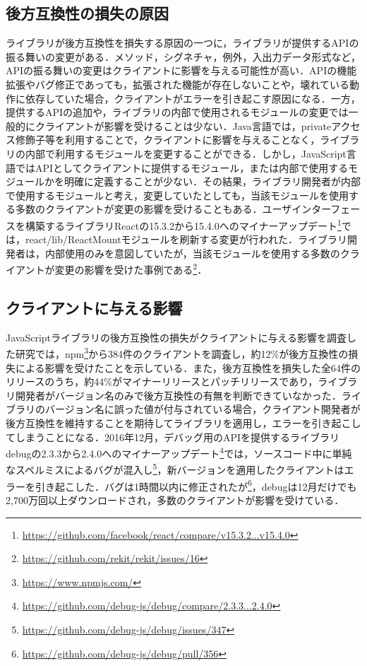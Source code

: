 \documentclass[submit]{ipsj}
\begin{document}
\subsection{後方互換性の損失の原因}
ライブラリが後方互換性を損失する原因の一つに，ライブラリが提供するAPIの振る舞いの変更がある．メソッド，シグネチャ，例外，入出力データ形式など，APIの振る舞いの変更はクライアントに影響を与える可能性が高い．APIの機能拡張やバグ修正であっても，拡張された機能が存在しないことや，壊れている動作に依存していた場合，クライアントがエラーを引き起こす原因になる．一方，提供するAPIの追加や，ライブラリの内部で使用されるモジュールの変更では一般的にクライアントが影響を受けることは少ない．Java言語では，privateアクセス修飾子等を利用することで，クライアントに影響を与えることなく，ライブラリの内部で利用するモジュールを変更することができる．しかし，JavaScript言語ではAPIとしてクライアントに提供するモジュール，または内部で使用するモジュールかを明確に定義することが少ない．その結果，ライブラリ開発者が内部で使用するモジュールと考え，変更していたとしても，当該モジュールを使用する多数のクライアントが変更の影響を受けることもある．ユーザインターフェースを構築するライブラリReactの15.3.2から15.4.0へのマイナーアップデート\footnote{\url{https://github.com/facebook/react/compare/v15.3.2...v15.4.0}}では，react/lib/ReactMountモジュールを刷新する変更が行われた．ライブラリ開発者は，内部使用のみを意図していたが，当該モジュールを使用する多数のクライアントが変更の影響を受けた事例である\footnote{\url{https://github.com/rekit/rekit/issues/16}}．

\subsection{クライアントに与える影響}
JavaScriptライブラリの後方互換性の損失がクライアントに与える影響を調査した研究\cite{impact-analysis-for-clients}では，npm\footnote{\url{https://www.npmjs.com/}}から384件のクライアントを調査し，約12\%が後方互換性の損失による影響を受けたことを示している．また，後方互換性を損失した全64件のリリースのうち，約44\%がマイナーリリースとパッチリリースであり，ライブラリ開発者がバージョン名のみで後方互換性の有無を判断できていなかった．ライブラリのバージョン名に誤った値が付与されている場合，クライアント開発者が後方互換性を維持することを期待してライブラリを適用し，エラーを引き起こしてしまうことになる．2016年12月，デバッグ用のAPIを提供するライブラリdebugの2.3.3から2.4.0へのマイナーアップデート\footnote{\url{https://github.com/debug-js/debug/compare/2.3.3...2.4.0}}では，ソースコード中に単純なスペルミスによるバグが混入し\footnote{\url{https://github.com/debug-js/debug/issues/347}}，新バージョンを適用したクライアントはエラーを引き起こした．バグは1時間以内に修正されたが\footnote{\url{https://github.com/debug-js/debug/pull/356}}，debugは12月だけでも2,700万回以上ダウンロードされ，多数のクライアントが影響を受けている．
\end{document}
